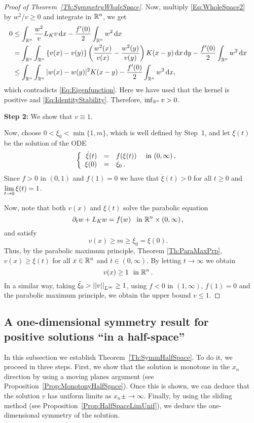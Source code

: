 \begin{proof}[Proof of Theorem~\ref{Th:SymmetryWholeSpace}]
Now, multiply \eqref{Eq:WholeSpace2} by $w^2/v\geq 0$ and integrate in $\mathbb{R}^n$, we get
\begin{align*}
0 &\leq \int_{\mathbb{R}^n} \frac{w^2}{v}  L_K v \,\mathrm{d} x - \frac{f'(0)}{2}\int_{\mathbb{R}^n} w^2 \,\mathrm{d} x \\
&= \int_{\mathbb{R}^n}\int_{\mathbb{R}^n}\left\{ v(x)-v(y) \right\} \left( \frac{w^2(x)}{v(x)}-\frac{w^2(y)}{v(y)} \right) K(x-y) \,\mathrm{d} x \,\mathrm{d} y - \frac{f'(0)}{2}\int_{\mathbb{R}^n} w^2 \,\mathrm{d} x \\
&\leq \int_{\mathbb{R}^n}\int_{\mathbb{R}^n} |w(x)-w(y)|^2 K(x-y) - \frac{f'(0)}{2}\int_{\mathbb{R}^n} w^2 \,\mathrm{d} x ,
\end{align*}
which contradicts \eqref{Eq:Eigenfunction}. Here we have used that the kernel is positive and \eqref{Eq:IdentityStability}. Therefore, $\inf_{\mathbb{R}^n} v >0$.

\textbf{Step 2:} We show that $v\equiv 1$.

Now, choose $0<\xi_0<\min\{1,m\}$, which is well defined by Step~1, and let $\xi(t)$ be the solution of the ODE
$$
\left\{\begin{array}{rcll}
\dot{\xi}(t) &=& f(\xi(t)) & \textrm{ in }(0,\infty)\,,\\
\xi(0) &=& \xi_0\,.
\end{array} \right.
$$
Since $f>0$ in $(0,1)$ and $f(1) = 0$ we have that $\dot{\xi}(t)>0$ for all $t\geq 0$ and $\displaystyle \lim_{t\to 0} \xi(t) = 1$.

Now, note that both $v(x)$ and $\xi(t)$ solve the parabolic equation
$$ \partial_t w + L_K w = f(w) \,\,\, \textrm{ in }\mathbb{R}^n\times (0,\infty)\,, $$
and satisfy
$$ v(x) \geq m \geq \xi_0 = \xi(0). $$
Thus, by the parabolic maximum principle, Theorem \ref{Th:ParaMaxPrp}, $v(x)\geq \xi(t)$ for all $x\in\mathbb{R}^n$ and $t\in(0,\infty)$. By letting $t \to \infty$ we obtain
$$ v(x) \geq 1 \,\, \textrm{ in }\mathbb{R}^n\,.  $$
In a similar way, taking $\tilde{\xi}_0>\left | \left |{v} \right | \right |_{L^\infty} \geq 1$, using $f<0$ in $(1,\infty)$, $f(1)=0$ and the parabolic maximum principle, we obtain the upper bound $v\leq 1$.

\end{proof}



\subsection{A one-dimensional symmetry result for positive solutions ``in a half-space''}

In this subsection we establish Theorem~\ref{Th:SymmHalfSpace}. To do it, we proceed in three steps. First, we show that the solution is monotone in the $x_n$ direction by using a moving planes argument (see Proposition~\ref{Prop:MonotonyHalfSpace}). Once this is shown, we can deduce that the solution $v$ has uniform limits as $x_n\pm\to \infty$. Finally, by using the sliding method (see Proposition~\ref{Prop:HalfSpaceLimUnif}), we deduce the one-dimensional symmetry of the solution.

